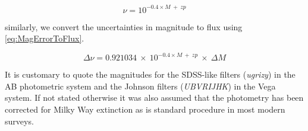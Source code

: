 \begin{equation}
\label{eq:MagToFlux}
\nu = 10^{-0.4 \times M~+~zp}
\end{equation}

\noindent similarly, we convert the uncertainties in magnitude to flux using \eqref{eq:MagErrorToFlux}.

\begin{equation}
\label{eq:MagErrorToFlux}
\Delta \nu = 0.921034~\times~10^{-0.4 \times M~+~zp}~\times~\Delta M
\end{equation}

It is customary to quote the magnitudes for the SDSS-like filters (\textit{ugrizy}) in the AB photometric system and the Johnson filters (\textit{UBVRIJHK}) in the Vega system. If not stated otherwise it was also assumed that the photometry has been corrected for Milky Way extinction as is standard procedure in most modern surveys.

